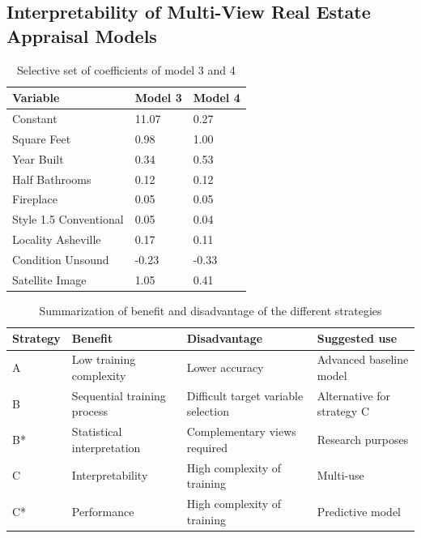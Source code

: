 \documentclass[letterpaper]{article}
\begin{document}
\subsection{Interpretability of Multi-View Real Estate Appraisal Models}

\begin{table}[b]
\centering
\begin{tabular}{|l|l|l|}
\hline
\textbf{Variable} & \textbf{Model 3} & \textbf{Model 4} \\ \hline
Constant & 11.07 & 0.27 \\
Square Feet  & 0.98  & 1.00 \\
Year Built  & 0.34 & 0.53 \\
Half Bathrooms   & 0.12 & 0.12 \\
Fireplace & 0.05 & 0.05 \\
Style 1.5 Conventional & 0.05 & 0.04 \\
Locality Asheville & 0.17 & 0.11 \\
Condition Unsound & -0.23 & -0.33 \\
\hline
Satellite Image  & 1.05 &  0.41 \\
\hline
\end{tabular}
\caption{Selective set of coefficients of model 3 and 4}
\label{tab:coefficients}
\end{table}

\begin{table}[t]
\centering
\begin{adjustbox}{width=1.42\columnwidth}
\begin{tabular}{|l|l|l|l|}
\hline
\textbf{Strategy} & \textbf{Benefit} & \textbf{Disadvantage} & \textbf{Suggested use} \\ \hline
A & Low training complexity & Lower accuracy & Advanced baseline model \\ \hline
B & Sequential training process & Difficult target variable selection & Alternative for strategy C \\ \hline
B* & Statistical interpretation & Complementary views required & Research purposes \\ \hline
C & Interpretability & High complexity of training & Multi-use \\  \hline
C* & Performance & High complexity of training & Predictive model \\
\hline
\end{tabular}
\end{adjustbox}
\vspace{-2.15mm}
\caption{Summarization of benefit and disadvantage of the different strategies}
\label{tab:strength}
\end{table}
\end{document}
